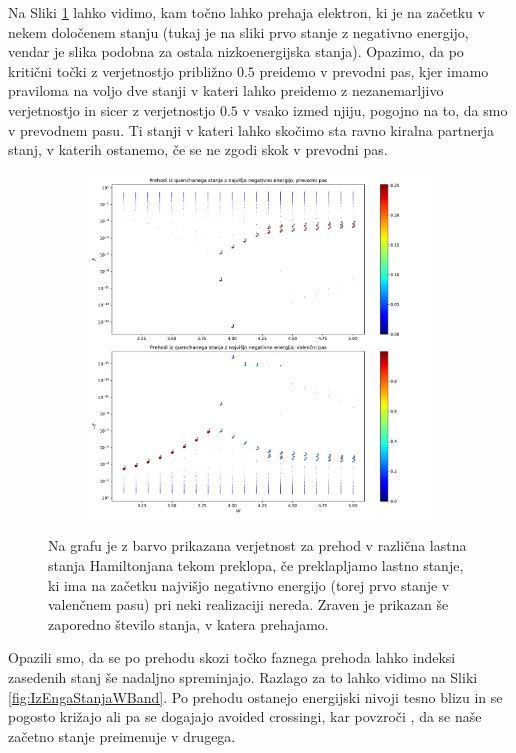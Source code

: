 Na Sliki \ref{fig:IzEngaStanja} lahko vidimo, kam točno lahko prehaja elektron, ki je na začetku v nekem določenem stanju (tukaj je na sliki prvo stanje z negativno energijo, vendar je slika podobna za ostala nizkoenergijska stanja). Opazimo, da po kritični točki z verjetnostjo približno $0.5$ preidemo v prevodni pas, kjer imamo praviloma na voljo dve stanji v kateri lahko preidemo z nezanemarljivo verjetnostjo in sicer z verjetnostjo $0.5$ v vsako izmed njiju, pogojno na to, da smo v prevodnem pasu. Ti stanji v kateri lahko skočimo sta ravno kiralna partnerja stanj, v katerih ostanemo, če se ne zgodi skok v prevodni pas.  
\begin{figure}[H]
\centering
\begin{subfigure}{\textwidth}
\includegraphics[width=\linewidth]{Figures/IzEngaStanja.pdf}
\end{subfigure}
\caption{Na grafu je z barvo prikazana verjetnost za prehod v različna lastna stanja Hamiltonjana tekom preklopa, če preklapljamo lastno stanje, ki ima na začetku najvišjo negativno energijo (torej prvo stanje v valenčnem pasu) pri neki realizaciji nereda. Zraven je prikazan še zaporedno število stanja, v katera prehajamo.}
\label{fig:IzEngaStanja}
\end{figure}

Opazili smo, da se po prehodu skozi točko faznega prehoda lahko indeksi zasedenih stanj še nadaljno spreminjajo. Razlago za to lahko vidimo na Sliki \ref{fig:IzEngaStanjaWBand}. Po prehodu ostanejo energijski nivoji tesno blizu in se pogosto križajo ali pa se dogajajo avoided crossingi, kar povzroči , da se naše začetno stanje preimenuje v drugega.

